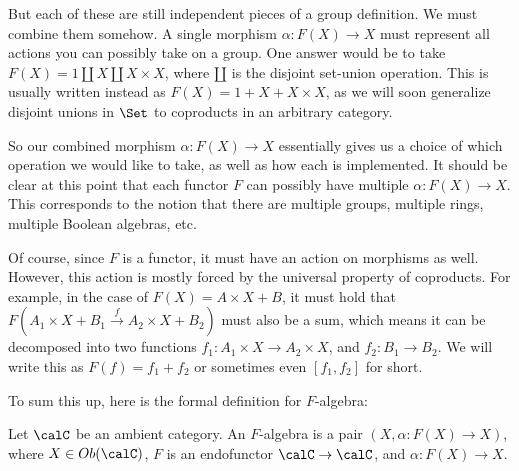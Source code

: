 But each of these are still independent pieces of a group definition.
We must combine them somehow.
A single morphism $\alpha : F(X) \rightarrow X$ must represent all actions you can possibly take on a group.
One answer would be to take $F(X) = 1 \amalg X \amalg X \times X$, where $\amalg$ is the disjoint set-union operation.
This is usually written instead as $F(X) = 1 + X + X \times X$, as we will soon generalize disjoint unions in $\Set$ to coproducts in an arbitrary category.

So our combined morphism $\alpha : F(X) \rightarrow X$ essentially gives us a choice of which operation we would like to take, as well as how each is implemented.
It should be clear at this point that each functor $F$ can possibly have multiple $\alpha : F(X) \rightarrow X$.
This corresponds to the notion that there are multiple groups, multiple rings, multiple Boolean algebras, etc.

Of course, since $F$ is a functor, it must have an action on morphisms as well.
However, this action is mostly forced by the universal property of coproducts.
For example, in the case of $F(X) = A \times X + B$, it must hold that $F(A_1 \times X + B_1 \xrightarrow{f} A_2 \times X + B_2)$ must also be a sum, which means it can be decomposed into two functions $f_1 : A_1 \times X \rightarrow A_2 \times X$, and $f_2 : B_1 \rightarrow B_2$.
We will write this as $F(f) = f_1 + f_2$ or sometimes even $[f_1, f_2]$ for short.

To sum this up, here is the formal definition for $F$-algebra:

\begin{definition}
  Let $\calC$ be an ambient category.
  An $F$-algebra is a pair $(X, \alpha : F(X) \rightarrow X)$, where $X \in Ob(\calC)$, $F$ is an endofunctor $\calC \rightarrow \calC$, and $\alpha : F(X) \rightarrow X$.
\end{definition}
